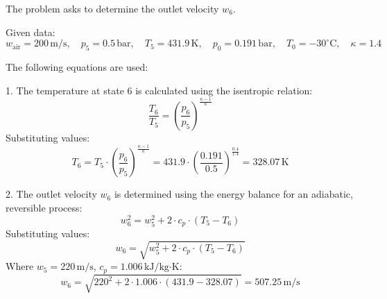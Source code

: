 The problem asks to determine the outlet velocity \( w_6 \).  

Given data:  
\[
w_{\text{air}} = 200 \, \text{m/s}, \quad p_5 = 0.5 \, \text{bar}, \quad T_5 = 431.9 \, \text{K}, \quad p_0 = 0.191 \, \text{bar}, \quad T_0 = -30^\circ\text{C}, \quad \kappa = 1.4
\]  

The following equations are used:  

1. The temperature at state 6 is calculated using the isentropic relation:  
\[
\frac{T_6}{T_5} = \left( \frac{p_6}{p_5} \right)^{\frac{\kappa - 1}{\kappa}}
\]  
Substituting values:  
\[
T_6 = T_5 \cdot \left( \frac{p_6}{p_5} \right)^{\frac{\kappa - 1}{\kappa}} = 431.9 \cdot \left( \frac{0.191}{0.5} \right)^{\frac{0.4}{1.4}} = 328.07 \, \text{K}
\]  

2. The outlet velocity \( w_6 \) is determined using the energy balance for an adiabatic, reversible process:  
\[
w_6^2 = w_5^2 + 2 \cdot c_p \cdot (T_5 - T_6)
\]  
Substituting values:  
\[
w_6 = \sqrt{w_5^2 + 2 \cdot c_p \cdot (T_5 - T_6)}
\]  
Where \( w_5 = 220 \, \text{m/s} \), \( c_p = 1.006 \, \text{kJ/kg·K} \):  
\[
w_6 = \sqrt{220^2 + 2 \cdot 1.006 \cdot (431.9 - 328.07)} = 507.25 \, \text{m/s}
\]